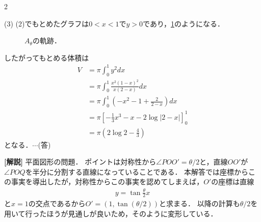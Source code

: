 \documentclass[../../main.tex]{subfiles}
\begin{document}
\begin{multicols}{2}
  \vspace{10pt}

  (3)
  (2)でもとめたグラフは$0<x<1$で$y>0$であり，\cref{1996-1:fig:3}のようになる．

  \begin{figure}[H]
    \caption{$A_{\theta}$の軌跡．}
    \label{1996-1:fig:3}
  \end{figure}

  したがってもとめる体積は
  \begin{align*}
    V
     & = \pi \int_0^1 y^2 dx                                   \\
     & = \pi \int_0^1 \frac{x^2(1-x)^2}{x(2-x)} dx             \\
     & = \pi \int_0^1 \left(-x^2 - 1 + \frac{2}{2-x}\right) dx \\
     & = \pi \left[-\frac{1}{3}x^3 - x - 2\log|2-x|\right]_0^1 \\
     & = \pi \left(2\log 2 - \frac{4}{3}\right)
  \end{align*}
  となる．$\cdots$(答)

  {\bf[解説]}
  平面図形の問題．
  ポイントは対称性から$\angle POO'=\theta/2$と，直線$OO'$が$\angle POQ$を半分に分割する直線になっていることである．
  本解答では座標からこの事実を導出したが，対称性からこの事実を認めてしまえば，$O'$の座標は直線
  \begin{align*}
    y = \tan\frac{\theta}{2} x
  \end{align*}
  と$x=1$の交点であるから$O'=(1,\tan(\theta/2))$と求まる．
  以降の計算も$\theta/2$を用いて行ったほうが見通しが良いため，そのように変形している．

  \newpage
\end{multicols}
\end{document}
